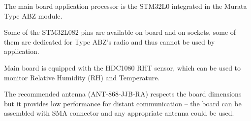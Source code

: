   The main board application processor is the STM32L0 \cite{STM32:STM32L082CZ} integrated in the Murata Type ABZ \cite{Murata:ABZ} module.
   
  Some of the STM32L082 pins are available on board and on sockets, some of them are dedicated for Type ABZ's radio and thus cannot be used by application.
  
  Main board is equipped with the HDC1080 RHT sensor, which can be used to monitor Relative Humidity (RH) and Temperature.
  
  The recommended antenna (ANT-868-JJB-RA) respects the board dimensions but it provides low performance for distant communication -- the board can be assembled with SMA connector and any appropriate antenna could be used.
  
  
  \newpage
  
